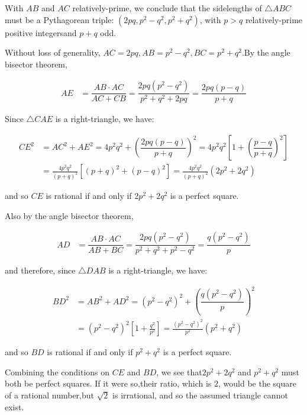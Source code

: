 \begin{enumerate}
 With $AB$ and $AC$ relatively-prime, we conclude that the sidelengths of $\triangle ABC$ must be a Pythagorean triple: $(2pq, p^2 - q^2, p^2 + q^2)$, with $p > q$ relatively-prime positive integersand $p+q$ odd.

 Without loss of generality, $AC = 2pq, AB = p^2 - q^2, BC = p^2+q^2$.By the angle bisector theorem,

 
 \begin{align*} AE &= \dfrac{AB \cdot AC}{AC + CB} = \dfrac{2pq(p^2-q^2)}{p^2 + q^2 + 2pq}    = \dfrac{2pq(p-q)}{p+q} \end{align*}


 

 Since $\triangle CAE$ is a right-triangle, we have:

 
 \begin{align*}   CE^2 &= AC^2 + AE^2        = 4p^2q^2 + \left(\dfrac{2pq(p-q)}{p+q}\right)^2        = 4p^2q^2\left[1 + \left(\dfrac{p-q}{p+q}\right)^2\right] \\        &= \frac{4p^2q^2}{(p+q)^2}\left[(p+q)^2 + (p-q)^2\right]        = \frac{4p^2q^2}{(p+q)^2}(2p^2 + 2q^2) \end{align*}


 

 and so $CE$ is rational if and only if $2p^2 + 2q^2$ is a perfect square.

 Also by the angle bisector theorem,

 
 \begin{align*} AD &= \dfrac{AB \cdot AC}{AB + BC} = \dfrac{2pq(p^2-q^2)}{p^2 + q^2 + p^2 - q^2}     = \dfrac{q(p^2-q^2)}{p} \end{align*}


 

 and therefore, since $\triangle DAB$ is a right-triangle, we have:

 
 \begin{align*}   BD^2 &= AB^2 + AD^2        = (p^2-q^2)^2 + \left(\dfrac{q(p^2-q^2)}{p}\right)^2 \\        &= (p^2-q^2)^2\left[1 + \frac{q^2}{p^2}\right]        = \frac{(p^2-q^2)^2}{p^2}(p^2 + q^2) \end{align*}


 

 and so $BD$ is rational if and only if $p^2 + q^2$ is a perfect square.

 Combining the conditions on $CE$ and $BD$, we see that$2p^2+2q^2$ and $p^2+q^2$ must both be perfect squares. If it were so,their ratio, which is $2$, would be the square of a rational number,but $\sqrt{2}$ is irrational, and so the assumed triangle cannot exist.


\end{enumerate}
